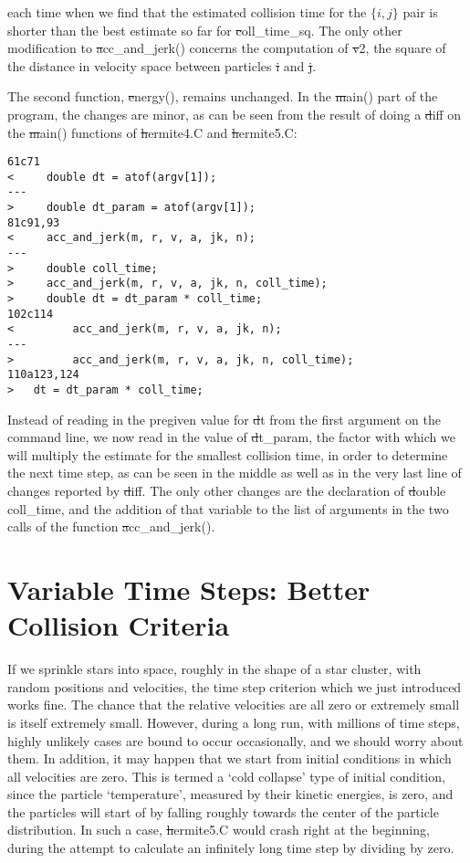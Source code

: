 each time when we find that the estimated collision time for the $\{i, j\}$
pair is shorter than the best estimate so far for {\st coll\_time\_sq}.
The only other modification to {\st acc\_and\_jerk()} concerns the
computation of {\st v2}, the square of the distance in velocity space
between particles {\st i} and {\st j}.  

The second function, {\st energy()}, remains unchanged.  In the {\st main()}
part of the program, the changes are minor, as can be seen from the result
of doing a {\st diff} on the {\st main()} functions of {\st hermite4.C}
and {\st hermite5.C}:

\begin{small}
\begin{verbatim}
61c71
<     double dt = atof(argv[1]);
---
>     double dt_param = atof(argv[1]);
81c91,93
<     acc_and_jerk(m, r, v, a, jk, n);
---
>     double coll_time;
>     acc_and_jerk(m, r, v, a, jk, n, coll_time);
>     double dt = dt_param * coll_time;
102c114
<         acc_and_jerk(m, r, v, a, jk, n);
---
>         acc_and_jerk(m, r, v, a, jk, n, coll_time);
110a123,124
> 	dt = dt_param * coll_time;
\end{verbatim}
\end{small}

Instead of reading in the pregiven value for {\st dt} from the first
argument on the command line, we now read in the value of {\st dt\_param},
the factor with which we will multiply the estimate for the smallest
collision time, in order to determine the next time step, as can be
seen in the middle as well as in the very last line of changes
reported by {\st diff}.  The only other changes are the declaration of
{\st double coll\_time}, and the addition of that variable to the
list of arguments in the two calls of the function {\st acc\_and\_jerk()}.

\section{Variable Time Steps: Better Collision Criteria}

If we sprinkle stars into space, roughly in the shape of a star cluster,
with random positions and velocities, the time step criterion which we
just introduced works fine.  The chance that the relative velocities
are all zero or extremely small is itself extremely small.  However,
during a long run, with millions of time steps, highly unlikely cases
are bound to occur occasionally, and we should worry about them.  In
addition, it may happen that we start from initial conditions in which
all velocities are zero.  This is termed a `cold collapse' type of
initial condition, since the particle `temperature', measured by their
kinetic energies, is zero, and the particles will start of by falling
roughly towards the center of the particle distribution.  In such a
case, {\st hermite5.C} would crash right at the beginning, during the
attempt to calculate an infinitely long time step by dividing by zero.

